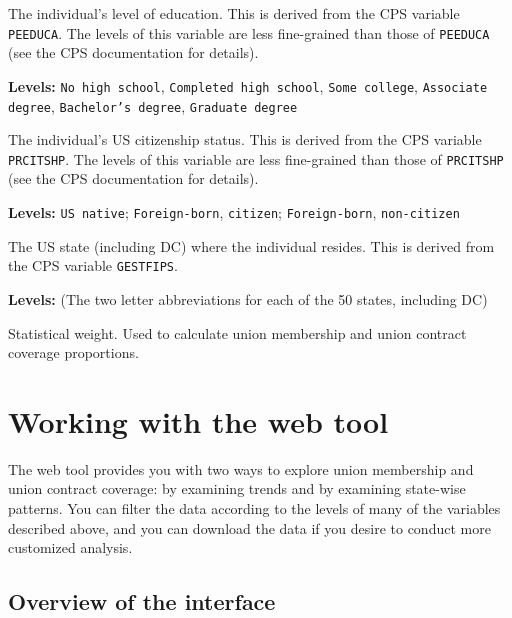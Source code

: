 \documentclass[letterpaper,12pt]{article}
\begin{document}
\begin{description}[style=multiline,leftmargin=3cm,font=\normalfont]
\item[\texttt{educ}] The individual's level of education. This is
  derived from the CPS variable \texttt{PEEDUCA}. The levels of this
  variable are less fine-grained than those of \texttt{PEEDUCA} (see
  the CPS documentation for details).

  \textbf{Levels:} \texttt{No high school}, \texttt{Completed high
    school}, \texttt{Some college}, \texttt{Associate degree},
  \texttt{Bachelor's degree}, \texttt{Graduate degree}

\item[\texttt{citizen}] The individual's US citizenship status. This
  is derived from the CPS variable \texttt{PRCITSHP}. The levels of
  this variable are less fine-grained than those of \texttt{PRCITSHP}
  (see the CPS documentation for details).

  \textbf{Levels:} \texttt{US native}; \texttt{Foreign-born},
  \texttt{citizen}; \texttt{Foreign-born}, \texttt{non-citizen}

\item[\texttt{state}] The US state (including DC) where the individual
  resides. This is derived from the CPS variable \texttt{GESTFIPS}.

  \textbf{Levels:} (The two letter abbreviations for each of the 50
  states, including DC)

\item[\texttt{weight}] Statistical weight. Used to calculate union
  membership and union contract coverage proportions.

\end{description}

\section{Working with the web tool}

The web tool provides you with two ways to explore union membership
and union contract coverage: by examining trends and by examining
state-wise patterns. You can filter the data according to the levels
of many of the variables described above, and you can download the
data if you desire to conduct more customized analysis.

\subsection{Overview of the interface}
\end{document}
